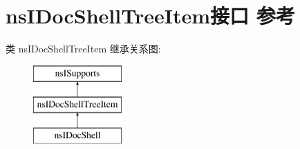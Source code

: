 \hypertarget{interfacens_i_doc_shell_tree_item}{}\section{ns\+I\+Doc\+Shell\+Tree\+Item接口 参考}
\label{interfacens_i_doc_shell_tree_item}
类 ns\+I\+Doc\+Shell\+Tree\+Item 继承关系图\+:\begin{figure}[H]
\begin{center}
\leavevmode
\includegraphics[height=3.000000cm]{interfacens_i_doc_shell_tree_item}
\end{center}
\end{figure}
